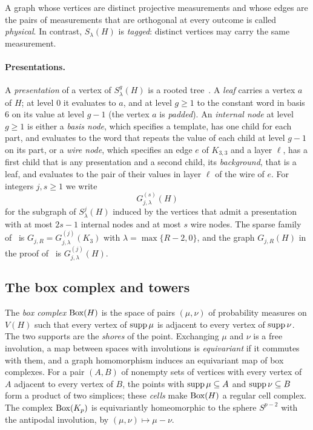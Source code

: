 A graph whose vertices are distinct projective measurements and whose edges are the pairs of measurements that are orthogonal at every outcome is called \emph{physical}. In contrast, $S_\lambda(H)$ is \emph{tagged}: distinct vertices may carry the same measurement.

\paragraph{Presentations.}
A \emph{presentation} of a vertex of $S^g_\lambda(H)$ is a rooted tree~\cite[Sections~3.1 and~7]{Z}. A \emph{leaf} carries a vertex $a$ of $H$; at level $0$ it evaluates to $a$, and at level $g\ge1$ to the constant word in basis $6$ on its value at level $g-1$ (the vertex $a$ is \emph{padded}). An \emph{internal node} at level $g\ge1$ is either a \emph{basis node}, which specifies a template, has one child for each part, and evaluates to the word that repeats the value of each child at level $g-1$ on its part, or a \emph{wire node}, which specifies an edge $e$ of $K_{3,3}$ and a layer $\ell$, has a first child that is any presentation and a second child, its \emph{background}, that is a leaf, and evaluates to the pair of their values in layer $\ell$ of the wire of $e$. For integers $j,s\ge1$ we write
\[
 G^{(s)}_{j,\lambda}(H)
\]
for the subgraph of $S^j_\lambda(H)$ induced by the vertices that admit a presentation with at most $2s-1$ internal nodes and at most $s$ wire nodes. The sparse family of~\cite{Z} is $G_{j,R}=G^{(j)}_{j,\lambda}(K_3)$ with $\lambda=\max\{R-2,0\}$, and the graph $G_{j,R}(H)$ in the proof of~\cite[Theorem~7.1]{Z} is $G^{(j)}_{j,\lambda}(H)$.

\subsection{The box complex and towers}\label{sec:box}

The \emph{box complex} $\operatorname{Box}(H)$ is the space of pairs $(\mu,\nu)$ of probability measures on $V(H)$ such that every vertex of $\operatorname{supp}\mu$ is adjacent to every vertex of $\operatorname{supp}\nu$. The two supports are the \emph{shores} of the point. Exchanging $\mu$ and $\nu$ is a free involution, a map between spaces with involutions is \emph{equivariant} if it commutes with them, and a graph homomorphism induces an equivariant map of box complexes. For a pair $(A,B)$ of nonempty sets of vertices with every vertex of $A$ adjacent to every vertex of $B$, the points with $\operatorname{supp}\mu\subseteq A$ and $\operatorname{supp}\nu\subseteq B$ form a product of two simplices; these \emph{cells} make $\operatorname{Box}(H)$ a regular cell complex. The complex $\operatorname{Box}(K_p)$ is equivariantly homeomorphic to the sphere $S^{p-2}$ with the antipodal involution, by $(\mu,\nu)\mapsto\mu-\nu$.

